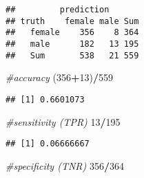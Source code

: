 \documentclass[]{article}
\newenvironment{Shaded}{\begin{snugshade}}{\end{snugshade}}
\newcommand{\CommentTok}[1]{\textcolor[rgb]{0.56,0.35,0.01}{\textit{#1}}}
\newcommand{\DataTypeTok}[1]{\textcolor[rgb]{0.13,0.29,0.53}{#1}}
\newcommand{\DecValTok}[1]{\textcolor[rgb]{0.00,0.00,0.81}{#1}}
\newcommand{\KeywordTok}[1]{\textcolor[rgb]{0.13,0.29,0.53}{\textbf{#1}}}
\newcommand{\NormalTok}[1]{#1}
\newcommand{\OperatorTok}[1]{\textcolor[rgb]{0.81,0.36,0.00}{\textbf{#1}}}
\newcommand{\StringTok}[1]{\textcolor[rgb]{0.31,0.60,0.02}{#1}}
\begin{document}
\begin{Shaded}
\end{Shaded}

\begin{verbatim}
##         prediction
## truth    female male Sum
##   female    356    8 364
##   male      182   13 195
##   Sum       538   21 559
\end{verbatim}

\begin{Shaded}
\begin{Highlighting}[]
\CommentTok{#accuracy}
\NormalTok{(}\DecValTok{356}\OperatorTok{+}\DecValTok{13}\NormalTok{)}\OperatorTok{/}\DecValTok{559}
\end{Highlighting}
\end{Shaded}

\begin{verbatim}
## [1] 0.6601073
\end{verbatim}

\begin{Shaded}
\begin{Highlighting}[]
\CommentTok{#sensitivity (TPR)}
\DecValTok{13}\OperatorTok{/}\DecValTok{195}
\end{Highlighting}
\end{Shaded}

\begin{verbatim}
## [1] 0.06666667
\end{verbatim}

\begin{Shaded}
\begin{Highlighting}[]
\CommentTok{#specificity (TNR)}
\DecValTok{356}\OperatorTok{/}\DecValTok{364}
\end{Highlighting}
\end{Shaded}
\end{document}
